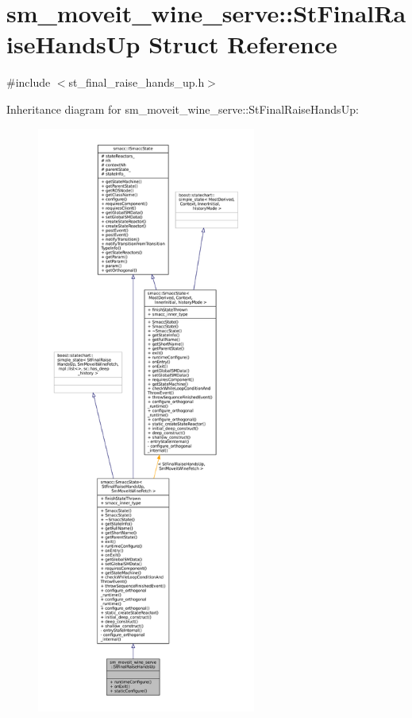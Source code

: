 \hypertarget{structsm__moveit__wine__serve_1_1StFinalRaiseHandsUp}{}\section{sm\+\_\+moveit\+\_\+wine\+\_\+serve\+:\+:St\+Final\+Raise\+Hands\+Up Struct Reference}
\label{structsm__moveit__wine__serve_1_1StFinalRaiseHandsUp}


{\ttfamily \#include $<$st\+\_\+final\+\_\+raise\+\_\+hands\+\_\+up.\+h$>$}



Inheritance diagram for sm\+\_\+moveit\+\_\+wine\+\_\+serve\+:\+:St\+Final\+Raise\+Hands\+Up\+:
\nopagebreak
\begin{figure}[H]
\begin{center}
\leavevmode
\includegraphics[height=550pt]{structsm__moveit__wine__serve_1_1StFinalRaiseHandsUp__inherit__graph}
\end{center}
\end{figure}


